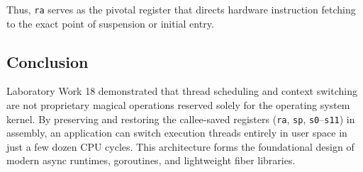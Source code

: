 \documentclass{labreport}
\begin{document}
Thus, \texttt{ra} serves as the pivotal register that directs hardware instruction fetching to the exact point of suspension or initial entry.

\subsection{Conclusion}
Laboratory Work 18 demonstrated that thread scheduling and context switching are not proprietary magical operations reserved solely for the operating system kernel. By preserving and restoring the callee-saved registers (\texttt{ra}, \texttt{sp}, \texttt{s0}--\texttt{s11}) in assembly, an application can switch execution threads entirely in user space in just a few dozen CPU cycles. This architecture forms the foundational design of modern async runtimes, goroutines, and lightweight fiber libraries.
\end{document}
